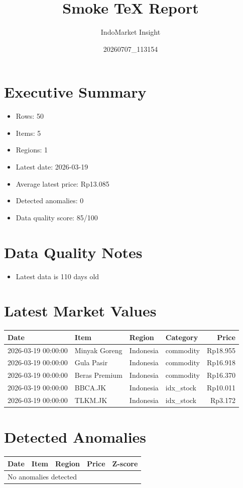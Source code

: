 \documentclass[11pt,a4paper]{article}
\title{Smoke TeX Report}
\author{IndoMarket Insight}
\date{20260707_113154}
\begin{document}
\maketitle

\section*{Executive Summary}
\begin{itemize}
    \item Rows: 50
    \item Items: 5
    \item Regions: 1
    \item Latest date: 2026-03-19
    \item Average latest price: Rp13.085
    \item Detected anomalies: 0
    \item Data quality score: 85/100
\end{itemize}

\section*{Data Quality Notes}
\begin{itemize}
\item Latest data is 110 days old
\end{itemize}

\section*{Latest Market Values}
\begin{longtable}{llllr}
\toprule
Date & Item & Region & Category & Price \\
\midrule
2026-03-19 00:00:00 & Minyak Goreng & Indonesia & commodity & Rp18.955 \\ 
2026-03-19 00:00:00 & Gula Pasir & Indonesia & commodity & Rp16.918 \\ 
2026-03-19 00:00:00 & Beras Premium & Indonesia & commodity & Rp16.370 \\ 
2026-03-19 00:00:00 & BBCA.JK & Indonesia & idx\_stock & Rp10.011 \\ 
2026-03-19 00:00:00 & TLKM.JK & Indonesia & idx\_stock & Rp3.172 \\ 
\bottomrule
\end{longtable}

\section*{Detected Anomalies}
\begin{longtable}{llllr}
\toprule
Date & Item & Region & Price & Z-score \\
\midrule
\multicolumn{5}{l}{No anomalies detected} \\ 
\bottomrule
\end{longtable}
\end{document}
